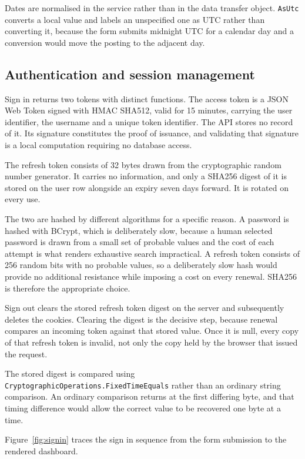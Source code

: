 \documentclass[11pt,a4paper]{article}
\newcommand{\code}[1]{\texttt{\fontsize{8.6}{10}\selectfont #1}}
\begin{document}
Dates are normalised in the service rather than in the data transfer object.
\code{AsUtc} converts a local value and labels an unspecified one as UTC rather
than converting it, because the form submits midnight UTC for a calendar day and
a conversion would move the posting to the adjacent day.

\subsection{Authentication and session management}

Sign in returns two tokens with distinct functions. The access token is a JSON
Web Token signed with HMAC SHA512, valid for 15 minutes, carrying the user
identifier, the username and a unique token identifier. The API stores no
record of it. Its signature constitutes the proof of issuance, and validating
that signature is a local computation requiring no database access.

The refresh token consists of 32 bytes drawn from the cryptographic random
number generator. It carries no information, and only a SHA256 digest of it is
stored on the user row alongside an expiry seven days forward. It is rotated on
every use.

The two are hashed by different algorithms for a specific reason. A password is
hashed with BCrypt, which is deliberately slow, because a human selected
password is drawn from a small set of probable values and the cost of each
attempt is what renders exhaustive search impractical. A refresh token consists
of 256 random bits with no probable values, so a deliberately slow hash would
provide no additional resistance while imposing a cost on every renewal. SHA256
is therefore the appropriate choice.

Sign out clears the stored refresh token digest on the server and subsequently
deletes the cookies. Clearing the digest is the decisive step, because renewal compares an incoming token against that stored
value. Once it is null, every copy of that refresh token is invalid, not only
the copy held by the browser that issued the request.

The stored digest is compared using \code{CryptographicOperations.FixedTimeEquals}
rather than an ordinary string comparison. An ordinary comparison returns at the
first differing byte, and that timing difference would allow the correct value to
be recovered one byte at a time.

Figure~\ref{fig:signin} traces the sign in sequence from the form submission to
the rendered dashboard.
\end{document}
